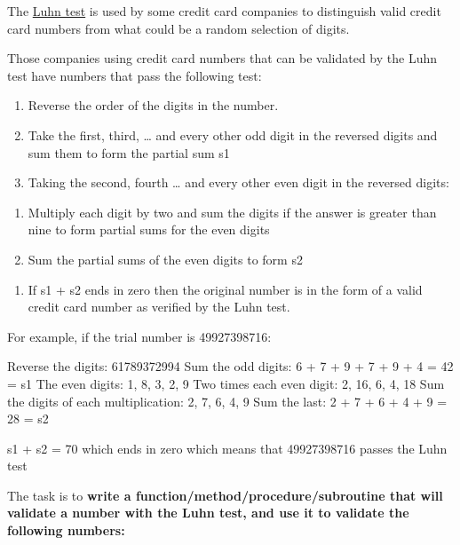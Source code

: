 \begin{itemize}
The \href{http://en.wikipedia.org/wiki/Luhn\_algorithm}{Luhn test} is
used by some credit card companies to distinguish valid credit card
numbers from what could be a random selection of digits.

Those companies using credit card numbers that can be validated by the
Luhn test have numbers that pass the following test:

\begin{enumerate}
\item
  Reverse the order of the digits in the number.
\item
  Take the first, third, \ldots{} and every other odd digit in the
  reversed digits and sum them to form the partial sum s1
\item
  Taking the second, fourth \ldots{} and every other even digit in the
  reversed digits:
\end{enumerate}

\begin{enumerate}
\item
  Multiply each digit by two and sum the digits if the answer is greater
  than nine to form partial sums for the even digits
\item
  Sum the partial sums of the even digits to form s2
\end{enumerate}

\begin{enumerate}
\item
  If s1 + s2 ends in zero then the original number is in the form of a
  valid credit card number as verified by the Luhn test.
\end{enumerate}

For example, if the trial number is 49927398716:

\begin{wideverbatim}
Reverse the digits:
  61789372994
Sum the odd digits:
  6 + 7 + 9 + 7 + 9 + 4 = 42 = s1
The even digits:
    1,  8,  3,  2,  9
  Two times each even digit:
    2, 16,  6,  4, 18
  Sum the digits of each multiplication:
    2,  7,  6,  4,  9
  Sum the last:
    2 + 7 + 6 + 4 + 9 = 28 = s2

s1 + s2 = 70 which ends in zero 
which means that 49927398716 passes the Luhn test
\end{wideverbatim}


\pagebreak{}

The task is to \textbf{write a function/method/procedure/subroutine that
will validate a number with the Luhn test, and use it to validate the
following numbers:}


\end{itemize}
